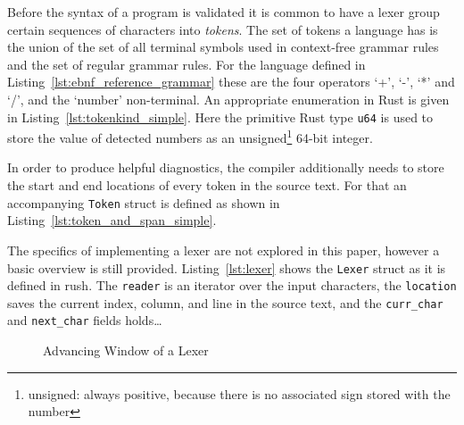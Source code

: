 Before the syntax of a program is validated it is common to have a lexer group certain sequences of characters into \emph{tokens}.
The set of tokens a language has is the union of the set of all terminal symbols used in context-free grammar rules and the set of regular grammar rules.
For the language defined in Listing~\ref{lst:ebnf_reference_grammar} these are the four operators `+', `-', `*' and `/', and the `number' non-terminal.
An appropriate enumeration in Rust is given in Listing~\ref{lst:tokenkind_simple}.
Here the primitive Rust type \texttt{u64} is used to store the value of detected numbers as an unsigned\footnote{unsigned: always positive, because there is no associated sign stored with the number} 64-bit integer.


In order to produce helpful diagnostics, the compiler additionally needs to store the start and end locations of every token in the source text. For that an accompanying \texttt{Token} struct is defined as shown in Listing~\ref{lst:token_and_span_simple}.


The specifics of implementing a lexer are not explored in this paper, however a basic overview is still provided.
Listing~\ref{lst:lexer} shows the \texttt{Lexer} struct as it is defined in rush.
The \texttt{reader} is an iterator over the input characters, the \texttt{location} saves the current index, column, and line in the source text, and the \texttt{curr\_char} and \texttt{next\_char} fields holds\ldots

\begin{figure}[h]
    \newcommand{\lexerframe}[8][]{\node(#2)[stack=7, rectangle split part fill={none,#3}, #1]{\ldots
        \nodepart{two}\texttt{#4}
        \nodepart{three}\texttt{#5}
        \nodepart{four}\texttt{#6}
        \nodepart{five}\texttt{#7}
        \nodepart{six}\texttt{#8}
        \nodepart{seven}\ldots
    };}
	\centering
	\caption{Advancing Window of a Lexer}\label{fig:lexer}
\end{figure}


\color{black}
